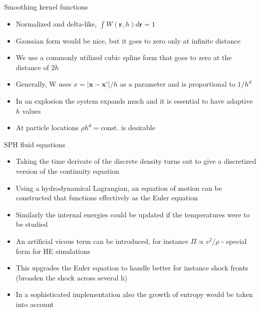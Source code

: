 \documentclass{beamer}
\begin{document}
\begin{frame}{Smoothing kernel functions}
\begin{itemize}

\item Normalized and delta-like, $\int W(\mathbf{r},h) d\mathbf{r} = 1$
\item Gaussian form would be nice, but it goes to zero only at infinite distance
\item We use a commonly utilized cubic spline form that goes to zero at the distance of $2h$
\item Generally, W uses $x = |\mathbf{x} - \mathbf{x}'|/h$ as a parameter and is proportional to $1/h^d$
\item In an explosion the system expands much and it is essential to have adaptive $h$ values
\item At particle locations $\rho h^d = \text{const.}$ is desirable

\end{itemize}
\end{frame}

\begin{frame}{SPH fluid equations}
\begin{itemize}

\item Taking the time derivate of the discrete density turns out to give a discretized version of the
continuity equation
\item Using a hydrodynamical Lagrangian, an equation of motion can be constructed that functions effectively
as the Euler equation
\item Similarly the internal energies could be updated if the temperatures were to be studied
\item An artificial vicous term can be introduced, for instance $\Pi \propto v^2/\rho$ - special form for HE simulations
\item This upgrades the Euler equation to handle better for instance shock fronts (broaden the shock across several h)
\item In a sophisticated implementation also the growth of entropy would be taken into account

\end{itemize}
\end{frame}
\end{document}
